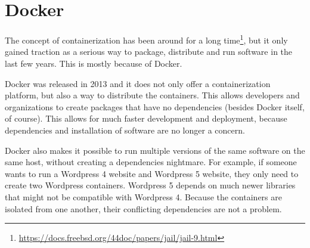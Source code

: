 \section{Docker}\label{background:docker}
The concept of containerization has been around for a long time\footnote{\url{https://docs.freebsd.org/44doc/papers/jail/jail-9.html}}, but it only gained traction as a serious way to package, distribute and run software in the last few years. This is mostly because of Docker.

\medskip

Docker was released in 2013 and it does not only offer a containerization platform, but also a way to distribute the containers. This allows developers and organizations to create packages that have no dependencies (besides Docker itself, of course). This allows for much faster development and deployment, because dependencies and installation of software are no longer a concern.

\medskip

Docker also makes it possible to run multiple versions of the same software on the same host, without creating a dependencies nightmare. For example, if someone wants to run a Wordpress 4 website and Wordpress 5 website, they only need to create two Wordpress containers. Wordpress 5 depends on much newer libraries that might not be compatible with Wordpress 4. Because the containers are isolated from one another, their conflicting dependencies are not a problem.










